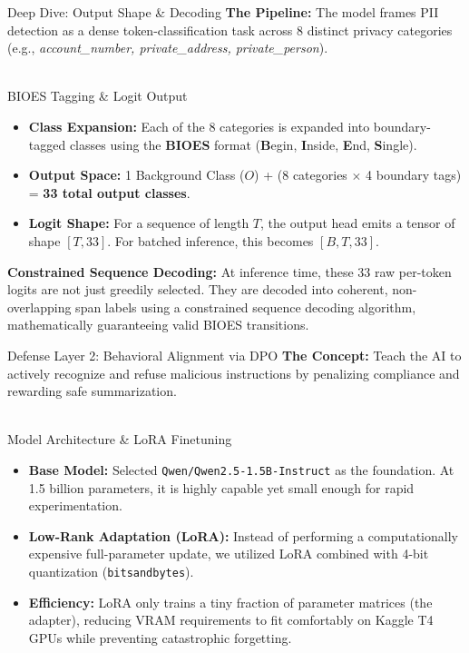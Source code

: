 \documentclass[aspectratio=169]{beamer}
\begin{document}
\begin{frame}{Deep Dive: Output Shape \& Decoding}
    \textbf{The Pipeline:} The model frames PII detection as a dense token-classification task across 8 distinct privacy categories (e.g., \textit{account\_number, private\_address, private\_person}). \\~\\
    
    \begin{block}{BIOES Tagging \& Logit Output}
        \begin{itemize}
            \item \textbf{Class Expansion:} Each of the 8 categories is expanded into boundary-tagged classes using the \textbf{BIOES} format (\textbf{B}egin, \textbf{I}nside, \textbf{E}nd, \textbf{S}ingle).
            \item \textbf{Output Space:} 1 Background Class ($O$) + (8 categories $\times$ 4 boundary tags) = \textbf{33 total output classes}.
            \item \textbf{Logit Shape:} For a sequence of length $T$, the output head emits a tensor of shape \textbf{$[T, 33]$}. For batched inference, this becomes \textbf{$[B, T, 33]$}.
        \end{itemize}
    \end{block}
    
    \vspace{0.2cm}
    \textbf{Constrained Sequence Decoding:} At inference time, these 33 raw per-token logits are not just greedily selected. They are decoded into coherent, non-overlapping span labels using a constrained sequence decoding algorithm, mathematically guaranteeing valid BIOES transitions.
\end{frame}

\begin{frame}{Defense Layer 2: Behavioral Alignment via DPO}
    \textbf{The Concept:} Teach the AI to actively recognize and refuse malicious instructions by penalizing compliance and rewarding safe summarization. \\~\\
    
    \begin{block}{Model Architecture \& LoRA Finetuning}
        \begin{itemize}
            \item \textbf{Base Model:} Selected \texttt{Qwen/Qwen2.5-1.5B-Instruct} as the foundation. At 1.5 billion parameters, it is highly capable yet small enough for rapid experimentation.
            \item \textbf{Low-Rank Adaptation (LoRA):} Instead of performing a computationally expensive full-parameter update, we utilized LoRA combined with 4-bit quantization (\texttt{bitsandbytes}).
            \item \textbf{Efficiency:} LoRA only trains a tiny fraction of parameter matrices (the adapter), reducing VRAM requirements to fit comfortably on Kaggle T4 GPUs while preventing catastrophic forgetting.
        \end{itemize}
    \end{block}
\end{frame}
\end{document}
